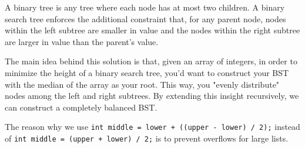 \begin{blocksection}
\begin{solution}
A binary tree is any tree where each node has at most two children.
A binary search tree enforces the additional constraint
that, for any parent node, nodes within the left subtree are smaller in value and the
nodes within the right subtree are larger in value than the parent's value.

The main idea behind this solution is that, given an array of integers, in order to minimize the
height of a binary search tree, you'd want to construct your BST with the median of the array as
your root. This way, you "evenly distribute" nodes among the left and right subtrees. By extending
this insight recursively, we can construct a completely balanced BST.

The reason why we use \lstinline{int middle = lower + ((upper - lower) / 2);} instead
of \lstinline{int middle = (upper + lower) / 2;} is to prevent overflows for large lists.
\end{solution}
\end{blocksection}
